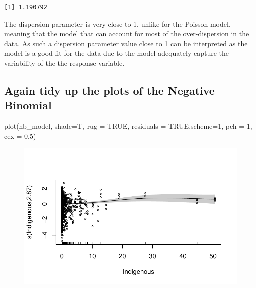 \documentclass[
  letterpaper,
  DIV=11,
  numbers=noendperiod]{scrartcl}
\newenvironment{Shaded}{\begin{snugshade}}{\end{snugshade}}
\newcommand{\AttributeTok}[1]{\textcolor[rgb]{0.40,0.45,0.13}{#1}}
\newcommand{\ConstantTok}[1]{\textcolor[rgb]{0.56,0.35,0.01}{#1}}
\newcommand{\DecValTok}[1]{\textcolor[rgb]{0.68,0.00,0.00}{#1}}
\newcommand{\FloatTok}[1]{\textcolor[rgb]{0.68,0.00,0.00}{#1}}
\newcommand{\FunctionTok}[1]{\textcolor[rgb]{0.28,0.35,0.67}{#1}}
\newcommand{\NormalTok}[1]{\textcolor[rgb]{0.00,0.23,0.31}{#1}}
\begin{document}
\begin{verbatim}
[1] 1.190792
\end{verbatim}

The dispersion parameter is very close to 1, unlike for the Poisson
model, meaning that the model that can account for most of the
over-dispersion in the data. As such a dispersion parameter value close
to 1 can be interpreted as the model is a good fit for the data due to
the model adequately capture the variability of the the response
variable.

\hypertarget{again-tidy-up-the-plots-of-the-negative-binomial}{%
\subsection{Again tidy up the plots of the Negative
Binomial}\label{again-tidy-up-the-plots-of-the-negative-binomial}}

\begin{Shaded}
\begin{Highlighting}[]
\FunctionTok{plot}\NormalTok{(nb\_model, }\AttributeTok{shade=}\NormalTok{T, }\AttributeTok{rug =} \ConstantTok{TRUE}\NormalTok{, }\AttributeTok{residuals =} \ConstantTok{TRUE}\NormalTok{,}\AttributeTok{scheme=}\DecValTok{1}\NormalTok{,}
\AttributeTok{pch =} \DecValTok{1}\NormalTok{, }\AttributeTok{cex =} \FloatTok{0.5}\NormalTok{)}
\end{Highlighting}
\end{Shaded}

\begin{figure}[H]

{\centering \includegraphics{Group34Coursework_files/figure-pdf/unnamed-chunk-16-1.pdf}

}

\end{figure}
\end{document}
